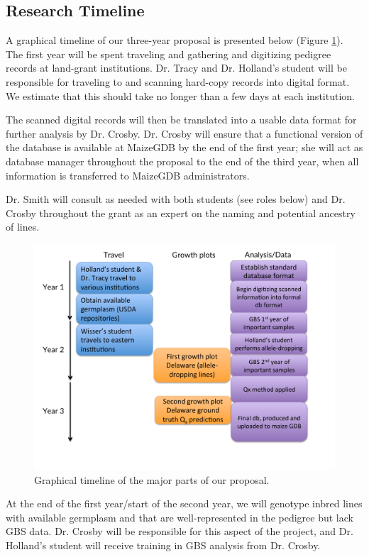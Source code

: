 \documentclass[12pt]{article}
\begin{document}
\subsection*{Research Timeline}
A graphical timeline of our three-year proposal is presented below (Figure \ref{fig:timeline}).
The first year will be spent traveling and gathering and digitizing pedigree records at land-grant institutions.
Dr. Tracy and Dr. Holland's  student will be responsible for traveling to and scanning hard-copy records into digital format.  We estimate that this should take no longer than a few days at each institution.


The scanned digital records will then be translated into a usable data format for further analysis by Dr. Crosby.  Dr. Crosby will ensure that a functional version of the database is available at MaizeGDB by the end of the first year; she will act as database manager throughout the proposal to the end of the third year, when all information is transferred to MaizeGDB administrators. 

Dr. Smith will consult as needed with both students (see roles below) and Dr. Crosby throughout the grant as an expert on the naming and potential ancestry of lines.

\begin{figure}
\centering
\includegraphics[width=0.7\linewidth]{timeline.pdf}
\caption{Graphical timeline of the major parts of our proposal.}
\label{fig:timeline}
\end{figure}

At the end of the first year/start of the second year, we will genotype inbred lines with available germplasm and that are well-represented in the pedigree but lack GBS data. 
Dr. Crosby will be responsible for this aspect of the project, and Dr. Holland's student will receive training in GBS analysis from Dr. Crosby. 
\end{document}
